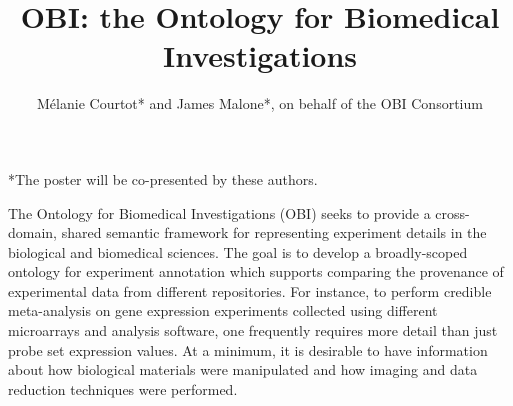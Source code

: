 \documentclass[a4paper]{article}
\title{\textbf{OBI: the Ontology for Biomedical Investigations}}
\author{M\'elanie Courtot*  and James Malone*,  on behalf of the OBI Consortium}
\date{}
\begin{document}

\maketitle\thispagestyle{empty}              %

 


*The poster will be co-presented by these authors.

The Ontology for Biomedical Investigations (OBI)  seeks to provide a cross-domain, shared semantic framework for representing experiment details in the biological and biomedical sciences.  The goal is to develop a broadly-scoped ontology for experiment annotation which supports comparing the provenance of experimental data from different repositories. For instance, to perform credible meta-analysis on gene expression experiments collected using different microarrays and analysis software, one frequently requires more detail than just probe set expression values.  At a minimum, it is desirable to have information about how biological materials were manipulated and how imaging and data reduction techniques were performed. 
\end{document}
